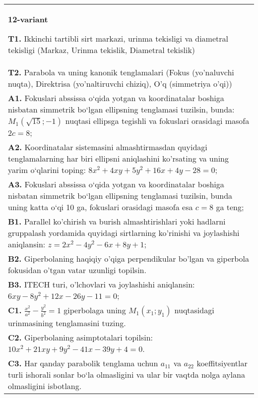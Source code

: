 \documentclass{article}
\begin{document}
\begin{tabular}{m{17cm}}
\textbf{12-variant}
\newline

\textbf{T1.} Ikkinchi tartibli sirt markazi, urinma tekisligi va diametral tekisligi (Markaz, Urinma tekislik, Diametral tekislik) \\
\textbf{T2.} Parabola va uning kanonik tenglamalari (Fokus (yo’naluvchi nuqta), Direktrisa (yo’naltiruvchi chiziq), O’q (simmetriya o’qi)) \\
\textbf{A1.} Fokuslari abssissa o‘qida yotgan va koordinatalar boshiga nisbatan simmetrik bo‘lgan ellipsning tenglamasi tuzilsin, bunda: $M_1(\sqrt{15} ;-1)$ nuqtasi ellipsga tegishli va fokuslari orasidagi masofa $2 c=8$; \\
\textbf{A2.} Koordinatalar sistemasini almashtirmasdan quyidagi tenglamalarning har biri ellipsni aniqlashini ko'rsating va uning yarim o‘qlarini toping: $8 x^2+4 x y+5 y^2+16 x+4 y-28=0$; \\
\textbf{A3.} Fokuslari abssissa o‘qida yotgan va koordinatalar boshiga nisbatan simmetrik bo‘lgan ellipsning tenglamasi tuzilsin, bunda uning katta o‘qi 10 ga, fokuslari orasidagi masofa esa $c = 8$ ga teng; \\
\textbf{B1.} Parallel ko'chirish va burish almashtirishlari yoki hadlarni gruppalash yordamida quyidagi sirtlarning ko'rinishi va joylashishi aniqlansin: $z=2 x^2-4 y^2-6 x+8 y+1$; \\
\textbf{B2.} Giperbolaning haqiqiy o'qiga perpendikular bo'lgan va giperbola fokusidan o'tgan vatar uzunligi topilsin. \\
\textbf{B3.} ITECH turi, o'lchovlari va joylashishi aniqlansin: $6 x y-8 y^2+12 x-26 y-11=0$; \\
\textbf{C1.} $\frac{x^2}{a^2}-\frac{y^2}{b^2}=1$ giperbolaga uning $M_1\left(x_1; y_1\right) $ nuqtasidagi urinmasining tenglamasini tuzing. \\
\textbf{C2.} Giperbolaning asimptotalari topilsin: $10 x^2+21 x y+9 y^2-41 x-39 y+4=0$. \\
\textbf{C3.} Har qanday parabolik tenglama uchun $a_{11}$ va $a_{22}$ koeffitsiyentlar turli ishorali sonlar bo‘la olmasligini va ular bir vaqtda nolga aylana olmasligini isbotlang. \\

\end{tabular}
\vspace{1cm}
\end{document}
